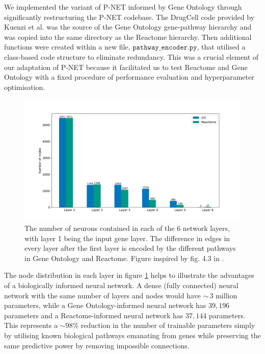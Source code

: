 \documentclass[NOTE, disdraft=true, UKenglish]{\DISCDTLATEXPATH UCLCDTDISdoc}
\begin{document}
We implemented the variant of P-NET informed by Gene Ontology through significantly restructuring the P-NET codebase. The DrugCell code provided by Kuenzi et al. \cite{kuenzi_predicting_2020} was the source of the Gene Ontology gene-pathway hierarchy and was copied into the same directory as the Reactome hierarchy. Then additional functions were created within a new file, $\mathtt{pathway\_encoder.py}$, that utilised a class-based code structure to eliminate redundancy. This was a crucial element of our adaptation of P-NET because it facilitated us to test Reactome and Gene Ontology with a fixed procedure of performance evaluation and hyperparameter optimisation.

\begin{figure}
    \centering
    \includegraphics[width=\linewidth]{Figures/layer_node_number.png}
    \caption{The number of neurons contained in each of the 6 network layers, with layer 1 being the input gene layer. The difference in edges in every layer after the first layer is encoded by the different pathways in Gene Ontology and Reactome. Figure inspired by fig. 4.3 in \cite{cosmin_thesis}.}
    \label{fig:nodedist}
\end{figure}

The node distribution in each layer in figure \ref{fig:nodedist} helps to illustrate the advantages of a biologically informed neural network. A dense (fully connected) neural network with the same number of layers and nodes would have $\sim\,3$ million parameters, while a Gene Ontology-informed neural network has $39, 196$ parameters and a Reactome-informed neural network has $37, 144$ parameters. This represents a $\sim 98 \%$ reduction in the number of trainable parameters simply by utilising known biological pathways emanating from genes while preserving the same predictive power by removing impossible connections.
\end{document}
